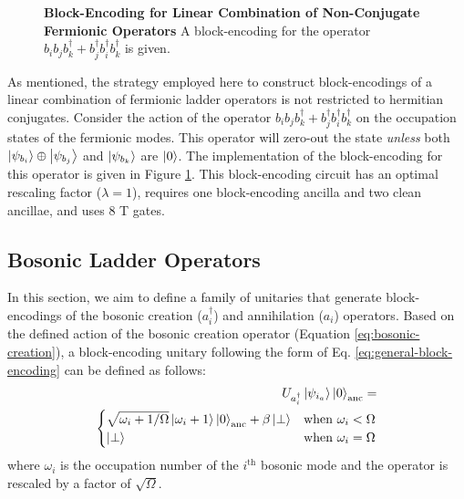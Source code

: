\begin{figure}
    
    \caption{
        \textbf{Block-Encoding for Linear Combination of Non-Conjugate Fermionic Operators}
        A block-encoding for the operator $b_i b_j b_k^\dagger + b_j^\dagger b_i^\dagger b_k^\dagger$ is given.
    }
    \label{fig:fermionic-be-lc-not-conjugate}
\end{figure}

As mentioned, the strategy employed here to construct block-encodings of a linear combination of fermionic ladder operators is not restricted to hermitian conjugates.
Consider the action of the operator $b_i b_j b_k^\dagger + b_j^\dagger b_i^\dagger b_k^\dagger$ on the occupation states of the fermionic modes.
This operator will zero-out the state \textit{unless} both $\ket{\psi_{b_i}} \oplus \ket{\psi_{b_j}}$ and $\ket{\psi_{b_k}}$ are $\ket{0}$.
The implementation of the block-encoding for this operator is given in Figure \ref{fig:fermionic-be-lc-not-conjugate}.
This block-encoding circuit has an optimal rescaling factor ($\lambda = 1$), requires one block-encoding ancilla and two clean ancillae, and uses $8$ T gates.

\subsection{Bosonic Ladder Operators}

In this section, we aim to define a family of unitaries that generate block-encodings of the bosonic creation ($a_i^\dagger$) and annihilation ($a_i$) operators.
Based on the defined action of the bosonic creation operator (Equation \ref{eq:bosonic-creation}), a block-encoding unitary following the form of Eq. \ref{eq:general-block-encoding} can be defined as follows: 
\begin{equation}
    \label{eq:be-bos-creation}
    \begin{split}
        U_{a^\dagger_i} \ket{\psi_{i_a}} \ket{0}_\text{anc} = \\
        \begin{cases}
            \sqrt{\omega_i + 1 / \Omega} \ket{\omega_i + 1} \ket{0}_\text{anc} + \beta \ket{\perp} & \text{when } \omega_i < \Omega \\
            \ket{\perp} & \text{when } \omega_i = \Omega \\
        \end{cases}
    \end{split}
\end{equation}
where $\omega_i$ is the occupation number of the $i^\text{th}$ bosonic mode and the operator is rescaled by a factor of $\sqrt{\Omega}$.

